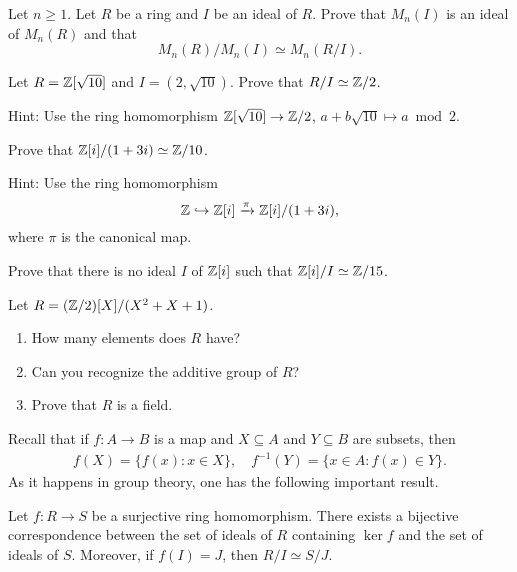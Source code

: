 \begin{exercise}
\label{xca:matrices}
	Let $n\geq1$. 
	Let $R$ be a ring and $I$ be an ideal of $R$. Prove that $M_n(I)$ is an ideal 
	of $M_n(R)$ and that 
    \[
    M_n(R)/M_n(I)\simeq M_n(R/I).
    \]
\end{exercise}

\begin{exercise}
    \label{xca:Z[sqrt10]/(2,sqrt10)}
    Let $R=\mathbb{Z}[\sqrt{10}]$ and $I=(2,\sqrt{10})$. Prove that $R/I\simeq\mathbb{Z}/2$. 	
\end{exercise}

Hint: Use the ring homomorphism $\mathbb{Z}[\sqrt{10}]\to\mathbb{Z}/2$, $a+b\sqrt{10}\mapsto a\bmod 2$. 	

\begin{exercise}
\label{xca:Z[i]/(1+3i)}
	Prove that $\mathbb{Z}[i]/(1+3i)\simeq\mathbb{Z}/10$. 	
\end{exercise}

Hint: Use 
the ring homomorphism 
\[
\mathbb{Z}\hookrightarrow\mathbb{Z}[i]\xrightarrow{\pi}\mathbb{Z}[i]/(1+3i),
\]
where
$\pi$ is the canonical map. 

\begin{exercise}
\label{xca:Z15}
	Prove that there is no ideal $I$ of $\mathbb{Z}[i]$ 
	such that $\mathbb{Z}[i]/I\simeq\mathbb{Z}/15$. 
\end{exercise}

\begin{exercise}
	Let $R=(\mathbb{Z}/2)[X]/(X^2+X+1)$. 
	\begin{enumerate}
		\item How many elements does $R$ have?
		\item Can you recognize the additive group of $R$?
		\item Prove that $R$ is a field. 	
	\end{enumerate}
\end{exercise}

Recall that if $f\colon A\to B$ is a map and $X\subseteq A$ and $Y\subseteq B$ are
subsets, then
\begin{align*}
    f(X)=\{f(x):x\in X\},\quad 
    f^{-1}(Y)=\{x\in A:f(x)\in Y\}.
\end{align*}
As it happens in group theory, one has the following important result. 

\begin{theorem}
\label{thm:ring_correspondence}
	Let $f\colon R\to S$ be a surjective ring homomorphism. There exists a
	bijective correspondence between 
	the set of ideals of $R$ containing $\ker f$ and
	the set of ideals of $S$.  Moreover, if $f(I)=J$, then
	$R/I\simeq S/J$. 
\end{theorem}

